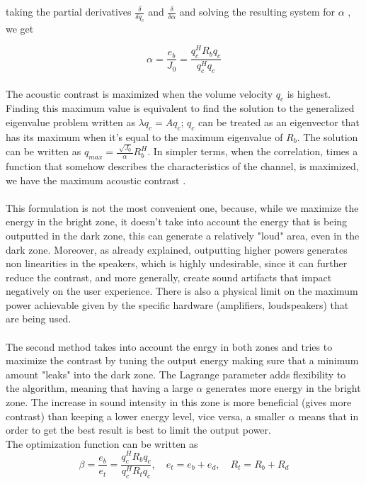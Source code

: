 taking the partial derivatives $\frac{\delta}{\delta q_c}$ and $\frac{\delta}{\delta \alpha}$ and solving the resulting system for $\alpha$ \parencite{choi_generation_2002,elliott_robustness_2012}, we get

\begin{equation}
\label{eqn:alpha}
\alpha=\frac{e_b}{J_0}=\frac{q_c^H R_b q_c}{q_c^Hq_c}
\end{equation}
\\
The acoustic contrast is maximized when the volume velocity $q_c$ is highest. Finding this maximum value is equivalent to find the solution to the generalized eigenvalue problem written as $\lambda q_c=A q_c$; $q_c$ can be treated as an eigenvector that has its maximum when it's equal to the maximum eigenvalue of $R_b$. The solution can be written as $q_{max} = \frac{\sqrt[]{J_0}}{\alpha} R_b^H$. In simpler terms, when the correlation, times a function that somehow describes the characteristics of the channel, is maximized, we have the maximum acoustic contrast
\parencite{shin_maximization_2010,choi_generation_2002}.
\\
\\
This formulation is not the most convenient one, because, while we maximize the energy in the bright zone, it doesn't take into account the energy that is being outputted in the dark zone, this can generate a relatively "loud" area, even in the dark zone. Moreover, as already explained, outputting higher powers generates non linearities in the speakers, which is highly undesirable, since it can further reduce the contrast, and more generally, create sound artifacts that impact negatively on the user experience. There is also a physical limit on the maximum power achievable given by the specific hardware (amplifiers, loudspeakers) that are being used.
\\
\\
The second method takes into account the enrgy in both zones and tries to maximize the contrast by tuning the output energy making sure that a minimum amount "leaks" into the dark zone. The Lagrange parameter adds flexibility to the algorithm, meaning that having a large $\alpha$ generates more energy in the bright zone. The increase in sound intensity in this zone is more beneficial (gives more contrast) than keeping a lower energy level, vice versa, a smaller $\alpha$ means that in order to get the best result is best to limit the output power. 
\\
The optimization function can be written as
\begin{equation}
\label{eqn:beta}
\beta=\frac{e_b}{e_t}=\frac{q_c^H R_b q_c}{q_c^H R_t q_c}, \quad e_t = e_b + e_d, \quad R_t = R_b + R_d
\end{equation}
